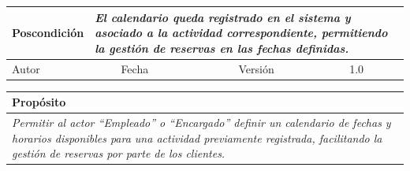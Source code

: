 \begin{table}[H]
\begin{tabular}{llllllll}
        \multicolumn{1}{|l|}{Poscondición}                           & \multicolumn{7}{p{10cm}|}{{\color[HTML]{808080} \textit{El calendario queda registrado en el sistema y asociado a la actividad correspondiente, permitiendo la gestión de reservas en las fechas definidas.}}}                                                                                                                                                                                                                                                       \\ \hline
        \multicolumn{1}{|l|}{Autor}                                  & \multicolumn{1}{l|}{{\color[HTML]{808080} \textit{}}}                           & \multicolumn{2}{l|}{Fecha}                                                   & \multicolumn{1}{l|}{}                          & \multicolumn{2}{l|}{Versión}                                                      & \multicolumn{1}{l|}{1.0}                                                     \\ \hline
        \end{tabular}
    \end{table}

    \begin{table}[H]
        \begin{tabular}{llllllll}
    \hline
    \multicolumn{8}{|l|}{\cellcolor[HTML]{F2F2F2}Propósito}                                                                                                                                                                                                                                                                                                                                                                                           \\ \hline
    \multicolumn{8}{|p{15cm}|}{{\color[HTML]{808080} \textit{Permitir al actor “Empleado” o “Encargado” definir un calendario de fechas y horarios disponibles para una actividad previamente registrada, facilitando la gestión de reservas por parte de los clientes.}}}                                                                                                                                                                                                             \\ \hline
    \end{tabular}
    \end{table}

